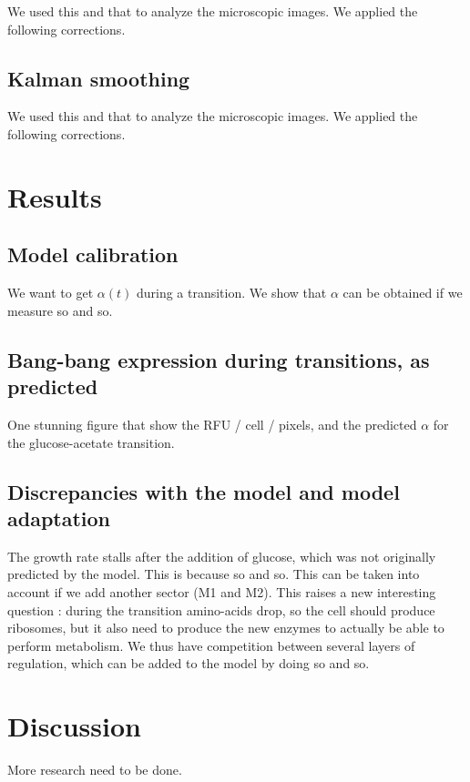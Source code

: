 We used this and that to analyze the microscopic images.
We applied the following corrections.

\subsection{Kalman smoothing}

We used this and that to analyze the microscopic images.
We applied the following corrections.

\section{Results}

\subsection{Model calibration}

We want to get $\alpha (t)$ during a transition. We show that $\alpha$ can be obtained if we measure so and so.

\subsection{Bang-bang expression during transitions, as predicted}

One stunning figure that show the RFU / cell / pixels, and the predicted $\alpha$ for the glucose-acetate transition.

\subsection{Discrepancies with the model and model adaptation}

The growth rate stalls after the addition of glucose, which was not originally predicted by the model.
This is because so and so.
This can be taken into account if we add another sector (M1 and M2).
This raises a new interesting question : during the transition amino-acids drop, so the cell should produce ribosomes, but it also need to produce the new enzymes to actually be able to perform metabolism.
We thus have competition between several layers of regulation, which can be added to the model by doing so and so.

\section{Discussion}

More research need to be done.

